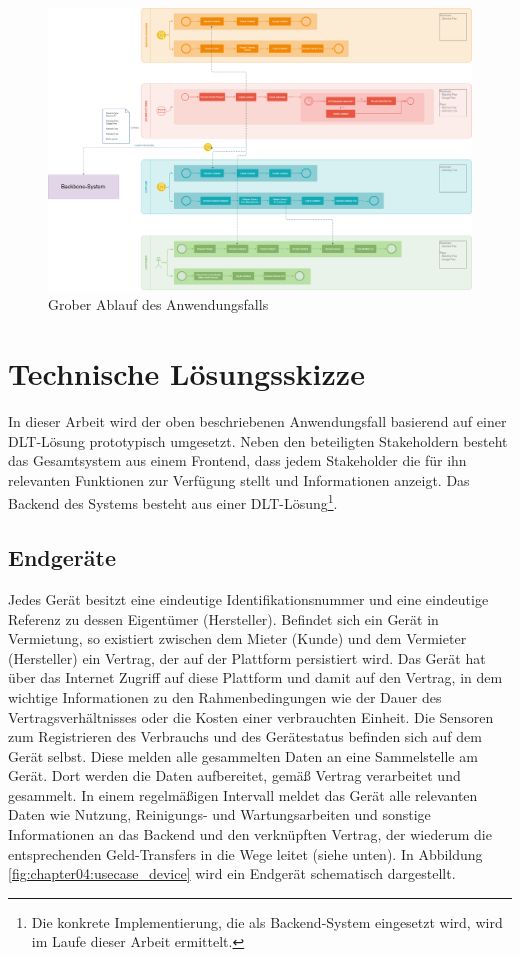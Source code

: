 \begin{figure}[htbp]
 \centering
 \includegraphics[width=1.0\textwidth]{gfx/IOT-Anwendungsfall_Ablauf.png}
 \caption{Grober Ablauf des Anwendungsfalls}
 \label{fig:chapter04:usecase_workflow}
\end{figure}

%
%
\section{Technische Lösungsskizze}
\label{sec:iot_usecase:solution}
In dieser Arbeit wird der oben beschriebenen Anwendungsfall basierend auf einer \ac{DLT}-Lösung prototypisch umgesetzt. Neben den beteiligten Stakeholdern besteht das Gesamtsystem aus einem Frontend, dass jedem Stakeholder die für ihn relevanten Funktionen zur Verfügung stellt und Informationen anzeigt. Das Backend des Systems besteht aus einer \ac{DLT}-Lösung\footnote{Die konkrete Implementierung, die als Backend-System eingesetzt wird, wird im Laufe dieser Arbeit ermittelt.}.

\subsection{Endgeräte}
\label{subsec:iot_usecase:solution:device}
Jedes Gerät besitzt eine eindeutige Identifikationsnummer und eine eindeutige Referenz zu dessen Eigentümer (Hersteller). Befindet sich ein Gerät in Vermietung, so existiert zwischen dem Mieter (Kunde) und dem Vermieter (Hersteller) ein Vertrag, der auf der Plattform persistiert wird. Das Gerät hat über das Internet Zugriff auf diese Plattform und damit auf den Vertrag, in dem wichtige Informationen zu den Rahmenbedingungen wie der Dauer des Vertragsverhältnisses oder die Kosten einer verbrauchten Einheit. Die Sensoren zum Registrieren des Verbrauchs und des Gerätestatus befinden sich auf dem Gerät selbst. Diese melden alle gesammelten Daten an eine Sammelstelle am Gerät. Dort werden die Daten aufbereitet, gemäß Vertrag verarbeitet und gesammelt. In einem regelmäßigen Intervall meldet das Gerät alle relevanten Daten wie Nutzung, Reinigungs- und Wartungsarbeiten und sonstige Informationen an das Backend und den verknüpften Vertrag, der wiederum die entsprechenden Geld-Transfers in die Wege leitet (siehe unten). In Abbildung \ref{fig:chapter04:usecase_device} wird ein Endgerät schematisch dargestellt.

